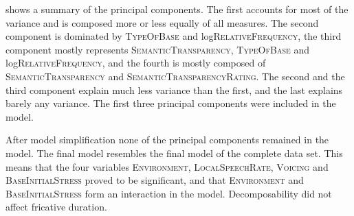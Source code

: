  shows a summary of the principal components. The first  accounts for most of the variance and is composed more or less equally of all measures. The second component is dominated by \textsc{TypeOfBase} and log\textsc{RelativeFrequency}, the third component mostly represents \textsc{SemanticTransparency}, \textsc{TypeOfBase} and log\textsc{RelativeFrequency}, and the fourth is mostly composed of \textsc{SemanticTransparency} and \textsc{SemanticTransparencyRating}. The second and the third component explain much less variance than the first, and the last  explains barely any variance. The first three principal components were included in the model.



After model simplification none of the principal components remained in the model. The final model resembles the final model of the complete data set. This means that the four variables \textsc{Environment}, \textsc{LocalSpeechRate}, \textsc{Voicing} and \textsc{BaseInitialStress} proved to be significant, and that \textsc{Environment} and \textsc{BaseInitialStress} form an interaction in the model. Decomposability did not affect fricative duration. 


\begin{table}
	\caption{ Summary of principal components}
	\label{tbl: summary PC discorpus}
	
	
\end{table}


